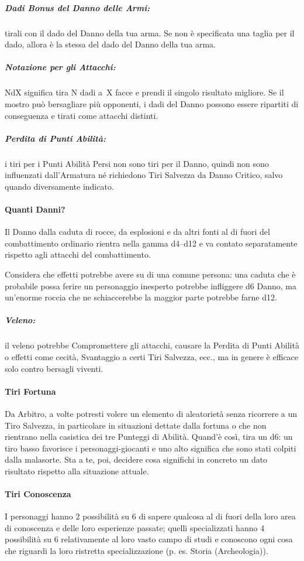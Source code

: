 \documentclass[itdr]{subfiles}
\begin{document}
\subparagraph{Dadi Bonus del Danno delle Armi:} tirali con il dado del Danno della tua arma. Se non è \mbox{specificata} una taglia per il dado, allora è la stessa del dado del Danno della tua arma.

\subparagraph{Notazione per gli Attacchi:} NdX significa tira N dadi a~X facce e prendi il singolo risultato migliore. Se il mostro può bersagliare più opponenti, i dadi del Danno possono essere ripartiti di conseguenza e tirati come attacchi distinti.

\subparagraph{Perdita di Punti Abilità:} i tiri per i Punti Abilità Persi non sono tiri per il Danno, quindi non sono influenzati dall’Armatura né richiedono Tiri Salvezza da Danno Critico, salvo quando diversamente indicato. 

\vfill

\paragraph{Quanti Danni?}
Il Danno dalla caduta di rocce, da esplosioni e da altri fonti al di fuori del combattimento ordinario rientra nella gamma d4--d12 e va contato separatamente rispetto agli attacchi del combattimento. 

Considera che effetti potrebbe avere su di una comune persona: una caduta che è probabile possa ferire un personaggio inesperto potrebbe infliggere d6 Danno, ma un’enorme roccia che ne schiaccerebbe la maggior parte potrebbe farne d12. 

\subparagraph{Veleno:} il veleno potrebbe Compromettere gli attacchi, causare la Perdita di Punti Abilità o effetti come cecità, Svantaggio a certi Tiri Salvezza, ecc., ma in genere è efficace solo contro bersagli viventi. 

\vfill

\paragraph{Tiri Fortuna}
Da Arbitro, a volte potresti volere un elemento di aleatorietà senza ricorrere a un Tiro Salvezza, in particolare in situazioni dettate dalla fortuna o che non rientrano nella casistica dei tre Punteggi di Abilità. Quand'è così, tira un d6: un tiro basso favorisce i personaggi-giocanti e uno alto significa che sono stati colpiti dalla malasorte. Sta a te, poi, decidere cosa significhi in concreto un dato risultato rispetto alla situazione attuale.

\vfill

\paragraph{Tiri Conoscenza}
I personaggi hanno 2 possibilità su 6 di sapere qualcosa al di fuori della loro area di conoscenza e delle loro esperienze passate; quelli specializzati hanno 4 possibilità su 6 relativamente al loro vasto campo di studi e conoscono ogni cosa che riguardi la loro ristretta specializzazione (p. es. Storia (Archeologia)).

\vfill
\end{document}
